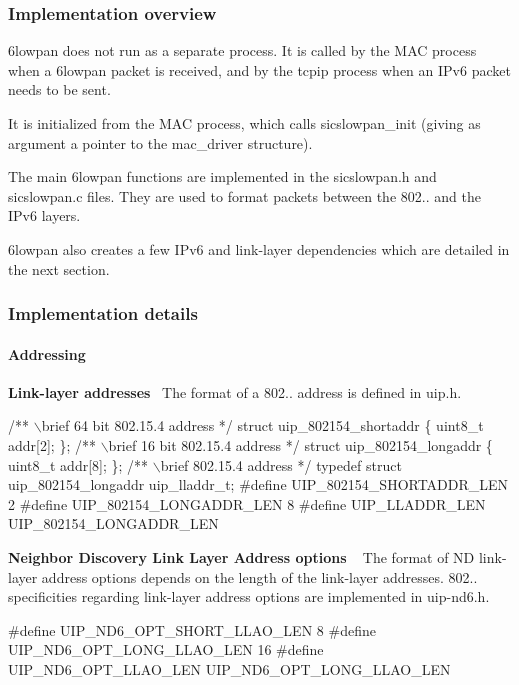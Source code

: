 \hypertarget{a00070_general}{}\subsubsection{Implementation overview}\label{a00070_general}
6lowpan does not run as a separate process. It is called by the M\+AC process when a 6lowpan packet is received, and by the tcpip process when an I\+Pv6 packet needs to be sent.

It is initialized from the M\+AC process, which calls sicslowpan\+\_\+init (giving as argument a pointer to the mac\+\_\+driver structure).

The main 6lowpan functions are implemented in the sicslowpan.\+h and sicslowpan.\+c files. They are used to format packets between the 802.. and the I\+Pv6 layers.

6lowpan also creates a few I\+Pv6 and link-\/layer dependencies which are detailed in the next section.



\hypertarget{a00070_implementation}{}\subsubsection{Implementation details}\label{a00070_implementation}
\hypertarget{a00070_Addressing}{}\paragraph{Addressing}\label{a00070_Addressing}
{\bfseries Link-\/layer addresses}~\newline
 The format of a 802.. address is defined in uip.\+h. 
\begin{DoxyCode}
\textcolor{comment}{/** \(\backslash\)brief 64 bit 802.15.4 address */}
\textcolor{keyword}{struct }uip\_802154\_shortaddr \{
  uint8\_t addr[2];
\};\textcolor{comment}{}
\textcolor{comment}{/** \(\backslash\)brief 16 bit 802.15.4 address */}
\textcolor{keyword}{struct }uip\_802154\_longaddr \{
  uint8\_t addr[8];
\};\textcolor{comment}{}
\textcolor{comment}{/** \(\backslash\)brief 802.15.4 address */}
\textcolor{keyword}{typedef} \textcolor{keyword}{struct }uip\_802154\_longaddr uip\_lladdr\_t;
\textcolor{preprocessor}{#define UIP\_802154\_SHORTADDR\_LEN 2}
\textcolor{preprocessor}{#define UIP\_802154\_LONGADDR\_LEN  8}
\textcolor{preprocessor}{#define UIP\_LLADDR\_LEN UIP\_802154\_LONGADDR\_LEN}
\end{DoxyCode}


{\bfseries Neighbor Discovery Link Layer Address options }~\newline
 The format of ND link-\/layer address options depends on the length of the link-\/layer addresses. 802.. specificities regarding link-\/layer address options are implemented in uip-\/nd6.\+h. 
\begin{DoxyCode}
\textcolor{preprocessor}{#define UIP\_ND6\_OPT\_SHORT\_LLAO\_LEN     8}
\textcolor{preprocessor}{#define UIP\_ND6\_OPT\_LONG\_LLAO\_LEN      16}
\textcolor{preprocessor}{#define UIP\_ND6\_OPT\_LLAO\_LEN UIP\_ND6\_OPT\_LONG\_LLAO\_LEN }
\end{DoxyCode}


